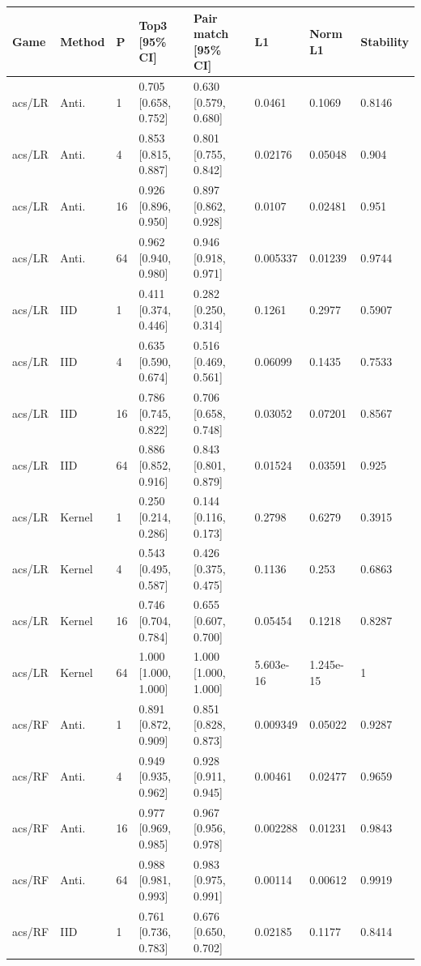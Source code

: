 \endgroup


\begingroup\footnotesize\setlength{\tabcolsep}{3pt}
\begin{tabular}{llllllll}
\toprule
Game & Method & P & Top3 [95\% CI] & Pair match [95\% CI] & L1 & Norm L1 & Stability \\
\midrule
acs/LR & Anti. & 1 & 0.705 [0.658, 0.752] & 0.630 [0.579, 0.680] & 0.0461 & 0.1069 & 0.8146 \\
acs/LR & Anti. & 4 & 0.853 [0.815, 0.887] & 0.801 [0.755, 0.842] & 0.02176 & 0.05048 & 0.904 \\
acs/LR & Anti. & 16 & 0.926 [0.896, 0.950] & 0.897 [0.862, 0.928] & 0.0107 & 0.02481 & 0.951 \\
acs/LR & Anti. & 64 & 0.962 [0.940, 0.980] & 0.946 [0.918, 0.971] & 0.005337 & 0.01239 & 0.9744 \\
acs/LR & IID & 1 & 0.411 [0.374, 0.446] & 0.282 [0.250, 0.314] & 0.1261 & 0.2977 & 0.5907 \\
acs/LR & IID & 4 & 0.635 [0.590, 0.674] & 0.516 [0.469, 0.561] & 0.06099 & 0.1435 & 0.7533 \\
acs/LR & IID & 16 & 0.786 [0.745, 0.822] & 0.706 [0.658, 0.748] & 0.03052 & 0.07201 & 0.8567 \\
acs/LR & IID & 64 & 0.886 [0.852, 0.916] & 0.843 [0.801, 0.879] & 0.01524 & 0.03591 & 0.925 \\
acs/LR & Kernel & 1 & 0.250 [0.214, 0.286] & 0.144 [0.116, 0.173] & 0.2798 & 0.6279 & 0.3915 \\
acs/LR & Kernel & 4 & 0.543 [0.495, 0.587] & 0.426 [0.375, 0.475] & 0.1136 & 0.253 & 0.6863 \\
acs/LR & Kernel & 16 & 0.746 [0.704, 0.784] & 0.655 [0.607, 0.700] & 0.05454 & 0.1218 & 0.8287 \\
acs/LR & Kernel & 64 & 1.000 [1.000, 1.000] & 1.000 [1.000, 1.000] & 5.603e-16 & 1.245e-15 & 1 \\
acs/RF & Anti. & 1 & 0.891 [0.872, 0.909] & 0.851 [0.828, 0.873] & 0.009349 & 0.05022 & 0.9287 \\
acs/RF & Anti. & 4 & 0.949 [0.935, 0.962] & 0.928 [0.911, 0.945] & 0.00461 & 0.02477 & 0.9659 \\
acs/RF & Anti. & 16 & 0.977 [0.969, 0.985] & 0.967 [0.956, 0.978] & 0.002288 & 0.01231 & 0.9843 \\
acs/RF & Anti. & 64 & 0.988 [0.981, 0.993] & 0.983 [0.975, 0.991] & 0.00114 & 0.00612 & 0.9919 \\
acs/RF & IID & 1 & 0.761 [0.736, 0.783] & 0.676 [0.650, 0.702] & 0.02185 & 0.1177 & 0.8414 \\

\end{tabular}
